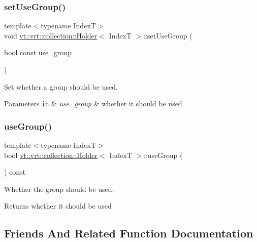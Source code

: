 \subsubsection{\texorpdfstring{set\+Use\+Group()}{setUseGroup()}}
{\footnotesize\ttfamily template$<$typename IndexT$>$ \\
void \hyperlink{structvt_1_1vrt_1_1collection_1_1_holder}{vt\+::vrt\+::collection\+::\+Holder}$<$ IndexT $>$\+::set\+Use\+Group (\begin{DoxyParamCaption}\item[{bool const}]{use\+\_\+group }\end{DoxyParamCaption})\hspace{0.3cm}{\ttfamily [inline]}}



Set whether a group should be used. 


\begin{DoxyParams}[1]{Parameters}
\mbox{\tt in}  & {\em use\+\_\+group} & whether it should be used \\
\hline
\end{DoxyParams}
\mbox{\label{structvt_1_1vrt_1_1collection_1_1_holder_a937fec77df65d71ad2d6a7c70017c49f}} 
\subsubsection{\texorpdfstring{use\+Group()}{useGroup()}}
{\footnotesize\ttfamily template$<$typename IndexT$>$ \\
bool \hyperlink{structvt_1_1vrt_1_1collection_1_1_holder}{vt\+::vrt\+::collection\+::\+Holder}$<$ IndexT $>$\+::use\+Group (\begin{DoxyParamCaption}{ }\end{DoxyParamCaption}) const\hspace{0.3cm}{\ttfamily [inline]}}



Whether the group should be used. 

\begin{DoxyReturn}{Returns}
whether it should be used 
\end{DoxyReturn}


\subsection{Friends And Related Function Documentation}
\mbox{\label{structvt_1_1vrt_1_1collection_1_1_holder_af9288b1963f434a90b307b5305a49510}} 
